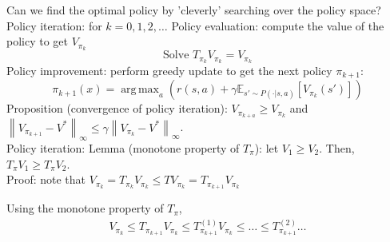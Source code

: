 \documentclass[oneside, 11pt, letterpaper]{book}
\newcommand{\E}{\mathbb{E}}
\newcommand{\gE}{\gamma \E_{s' \sim P(\cdot|s,a)}}
\DeclareMathOperator*{\argmax}{arg\,max}
\newcommand{\norm}[1]{\left\lVert#1\right\rVert}
\begin{document}
Can we find the optimal policy by 'cleverly' searching over the policy space? \\ 

\noindent Policy iteration: for $k=0,1,2,\dots$ Policy evaluation: compute the value of the policy to get $V_{\pi_k}$ 
\[
  \text{Solve } T_{\pi_k} V_{\pi_k} = V_{\pi_k}
\] 
Policy improvement: perform greedy update to get the next policy $\pi_{k+1}$:
\[
  \pi_{k+1}(x) = \argmax_{a} (r(s,a) + \gE [V_{\pi_k}(s')])
\]
Proposition (convergence of policy iteration): $V_{\pi_{k+a}} \geq V_{\pi_k}$ and $\norm{V_{\pi_{k+1}} - V^*}_{\infty} \leq \gamma \norm{V_{\pi_k} - V^*}_{\infty}$. \\ 

\noindent Policy iteration:
Lemma (monotone property of $T_\pi$): let $V_1 \geq V_2$. Then, $T_\pi V_1 \geq T_\pi V_2$. \\ 

\noindent Proof: note that $V_{\pi_k} = T_{\pi_k} V_{\pi_k} \leq TV_{\pi_k} = T_{\pi_{k+1}} V_{\pi_k} $

Using the monotone property of $T_\pi$,
\begin{align*}
  V_{\pi_k} \leq T_{\pi_{k+1}} V_{\pi_k} \leq T_{\pi_{k+1}}^{(1)} V_{\pi_k} \leq \dots \leq T_{\pi_{k+1}}^{(2)} \dots 
\end{align*}
\end{document}
